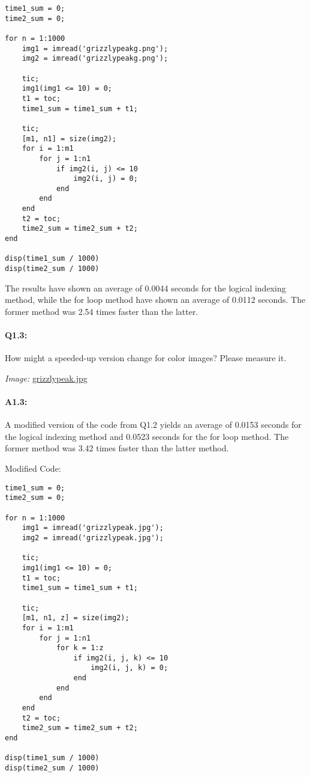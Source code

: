 \documentclass[11pt]{article}
\begin{document}
\begin{lstlisting}[style=Matlab-editor]
time1_sum = 0;
time2_sum = 0;

for n = 1:1000
    img1 = imread('grizzlypeakg.png');
    img2 = imread('grizzlypeakg.png');

    tic;
    img1(img1 <= 10) = 0;
    t1 = toc;
    time1_sum = time1_sum + t1;

    tic;
    [m1, n1] = size(img2);
    for i = 1:m1
        for j = 1:n1
            if img2(i, j) <= 10
                img2(i, j) = 0;
            end
        end
    end
    t2 = toc;
    time2_sum = time2_sum + t2;
end

disp(time1_sum / 1000)
disp(time2_sum / 1000)
\end{lstlisting}

The results have shown an average of 0.0044 seconds for the logical indexing method, while the for loop method have shown an average of 0.0112 seconds. The former method was 2.54 times faster than the latter.

\pagebreak
\paragraph{Q1.3:} How might a speeded-up version change for color images? Please measure it.

\emph{Image:} \href{grizzlypeak.jpg}{grizzlypeak.jpg}

\paragraph{A1.3:}
A modified version of the code from Q1.2 yields an average of 0.0153 seconds for the logical indexing method and 0.0523 seconds for the for loop method. The former method was 3.42 times faster than the latter method.

Modified Code:
\begin{lstlisting}[style=Matlab-editor]
time1_sum = 0;
time2_sum = 0;

for n = 1:1000
    img1 = imread('grizzlypeak.jpg');
    img2 = imread('grizzlypeak.jpg');

    tic;
    img1(img1 <= 10) = 0;
    t1 = toc;
    time1_sum = time1_sum + t1;

    tic;
    [m1, n1, z] = size(img2);
    for i = 1:m1
        for j = 1:n1
            for k = 1:z
                if img2(i, j, k) <= 10
                    img2(i, j, k) = 0;
                end
            end
        end
    end
    t2 = toc;
    time2_sum = time2_sum + t2;
end

disp(time1_sum / 1000)
disp(time2_sum / 1000)
\end{lstlisting}
\end{document}
